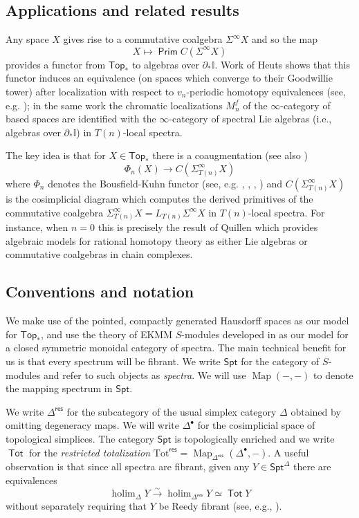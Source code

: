 \documentclass[12pt]{amsart}
\theoremstyle{definition}
\theoremstyle{remark}
\newcommand{\Top}{\mathsf{Top}_*}
\newcommand{\Spt}{\mathsf{Spt}}
\newcommand{\Sp}{\Sigma^{\infty}}
\newcommand{\Tot}{\operatorname{\mathsf{Tot}}}
\newcommand{\holim}{\operatorname{holim}}
\newcommand{\Map}{\operatorname{Map}}
\newcommand{\Id}{\mathbb{I}}
\newcommand{\Prim}{\operatorname{\mathsf{Prim}}}
\begin{document}
\subsection{Applications and related results}
Any space $X$ gives rise to a commutative coalgebra $\Sp X$ and so the map \[X\mapsto \Prim C(\Sp X)\] provides a functor from $\Top$ to algebras over $\partial_*\Id$. Work of Heuts \cite{Heuts-vn} shows that this functor induces an equivalence (on spaces which converge to their Goodwillie tower) after localization with respect to $v_n$-periodic homotopy equivalences (see, e.g. \cite{BR}); in the same work the chromatic localizations $M_n^f$ of the $\infty$-category of based spaces are identified with the $\infty$-category of spectral Lie algebras (i.e., algebras over $\partial_*\Id$) in $T(n)$-local spectra.

The key idea is that for $X\in \Top$ there is a coaugmentation (see also \cite{BR-1}) \[ \Phi_n(X)\to C(\Sp_{T(n)}X) \] where $\Phi_n$ denotes the Bousfield-Kuhn functor  (see, e.g. \cite{Bou-BK-functor}, \cite{Kuh-BK-functor}, \cite{Kuh-tel}, \cite{Heuts-vn}) and $C(\Sp_{T(n)} X)$ is the cosimplicial diagram which computes the derived primitives of the commutative coalgebra $\Sp_{T(n)}X =L_{T(n)}\Sp X$ in $T(n)$-local spectra. For instance, when $n=0$ this is precisely the result of Quillen \cite{Quillen} which provides algebraic models for rational homotopy theory as either Lie algebras or commutative coalgebras in chain complexes.

\subsection{Conventions and notation} \label{sec:conventions}
We make use of the pointed, compactly generated Hausdorff spaces as our model for $\Top$, and use the theory of EKMM $S$-modules developed in \cite{EKMM} as our model for a closed symmetric monoidal category of spectra. The main technical benefit for us is that every spectrum will be fibrant. We write $\Spt$ for the category of $S$-modules and refer to such objects as \textit{spectra}. We will use $\Map(-,-)$ to denote the mapping spectrum in $\Spt$.

We write $\Delta^{\mathsf{res}}$ for the subcategory of the usual simplex category $\Delta$ obtained by omitting degeneracy maps. We will write $\Delta^{\bullet}$ for the cosimplicial space of topological simplices. The category $\Spt$ is topologically enriched and we write $\Tot$ for the \textit{restricted totalization} $\mathrm{Tot}^{\mathsf{res}}=\Map_{\Delta^{\mathsf{res}}} (\Delta^{\bullet}, -)$. A useful observation is that since all spectra are fibrant, given any $Y\in \Spt^{\Delta}$ there are equivalences \[
    \holim_{\Delta} Y\xrightarrow{\sim} \holim_{\Delta^{\mathsf{res}}} Y \simeq \Tot Y\]
without separately requiring that $Y$ be Reedy fibrant (see, e.g., \cite[]{Ching-Harper-Koszul}).
\end{document}
